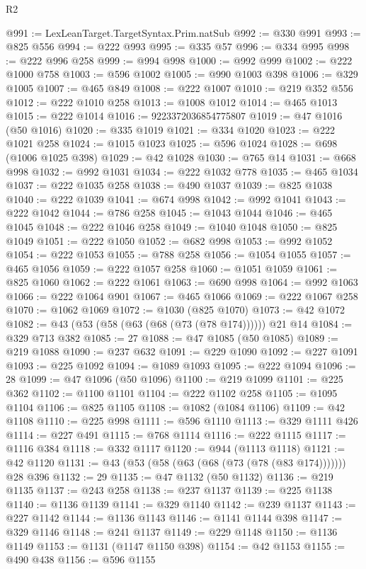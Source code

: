 \begin{lexlean}{R2}
\begin{coremodule}
@991 := LexLeanTarget.TargetSyntax.Prim.natSub
@992 := @330 @991
@993 := @825 @556
@994 := @222 @993
@995 := @335 @57
@996 := @334 @995
@998 := @222 @996 @258
@999 := @994 @998
@1000 := @992 @999
@1002 := @222 @1000 @758
@1003 := @596 @1002
@1005 := @990 @1003 @398
@1006 := @329 @1005
@1007 := @465 @849
@1008 := @222 @1007
@1010 := @219 @352 @556
@1012 := @222 @1010 @258
@1013 := @1008 @1012
@1014 := @465 @1013
@1015 := @222 @1014
@1016 := 9223372036854775807
@1019 := @47 @1016 (@50 @1016)
@1020 := @335 @1019
@1021 := @334 @1020
@1023 := @222 @1021 @258
@1024 := @1015 @1023
@1025 := @596 @1024
@1028 := @698 (@1006 @1025 @398)
@1029 := @42 @1028
@1030 := @765 @14
@1031 := @668 @998
@1032 := @992 @1031
@1034 := @222 @1032 @778
@1035 := @465 @1034
@1037 := @222 @1035 @258
@1038 := @490 @1037
@1039 := @825 @1038
@1040 := @222 @1039
@1041 := @674 @998
@1042 := @992 @1041
@1043 := @222 @1042
@1044 := @786 @258
@1045 := @1043 @1044
@1046 := @465 @1045
@1048 := @222 @1046 @258
@1049 := @1040 @1048
@1050 := @825 @1049
@1051 := @222 @1050
@1052 := @682 @998
@1053 := @992 @1052
@1054 := @222 @1053
@1055 := @788 @258
@1056 := @1054 @1055
@1057 := @465 @1056
@1059 := @222 @1057 @258
@1060 := @1051 @1059
@1061 := @825 @1060
@1062 := @222 @1061
@1063 := @690 @998
@1064 := @992 @1063
@1066 := @222 @1064 @901
@1067 := @465 @1066
@1069 := @222 @1067 @258
@1070 := @1062 @1069
@1072 := @1030 (@825 @1070)
@1073 := @42 @1072
@1082 := @43 (@53 (@58 (@63 (@68 (@73 (@78 @174)))))) @21 @14
@1084 := @329 @713 @382
@1085 := 27
@1088 := @47 @1085 (@50 @1085)
@1089 := @219 @1088
@1090 := @237 @632
@1091 := @229 @1090
@1092 := @227 @1091
@1093 := @225 @1092
@1094 := @1089 @1093
@1095 := @222 @1094
@1096 := 28
@1099 := @47 @1096 (@50 @1096)
@1100 := @219 @1099
@1101 := @225 @362
@1102 := @1100 @1101
@1104 := @222 @1102 @258
@1105 := @1095 @1104
@1106 := @825 @1105
@1108 := @1082 (@1084 @1106)
@1109 := @42 @1108
@1110 := @225 @998
@1111 := @596 @1110
@1113 := @329 @1111 @426
@1114 := @227 @491
@1115 := @768 @1114
@1116 := @222 @1115
@1117 := @1116 @384
@1118 := @332 @1117
@1120 := @944 (@1113 @1118)
@1121 := @42 @1120
@1131 := @43 (@53 (@58 (@63 (@68 (@73 (@78 (@83 @174))))))) @28 @396
@1132 := 29
@1135 := @47 @1132 (@50 @1132)
@1136 := @219 @1135
@1137 := @243 @258
@1138 := @237 @1137
@1139 := @225 @1138
@1140 := @1136 @1139
@1141 := @329 @1140
@1142 := @239 @1137
@1143 := @227 @1142
@1144 := @1136 @1143
@1146 := @1141 @1144 @398
@1147 := @329 @1146
@1148 := @241 @1137
@1149 := @229 @1148
@1150 := @1136 @1149
@1153 := @1131 (@1147 @1150 @398)
@1154 := @42 @1153
@1155 := @490 @438
@1156 := @596 @1155

\end{coremodule}
\end{lexlean}
